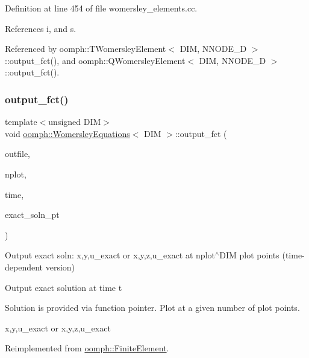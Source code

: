 Definition at line 454 of file womersley\+\_\+elements.\+cc.



References i, and s.



Referenced by oomph\+::\+T\+Womersley\+Element$<$ D\+I\+M, N\+N\+O\+D\+E\+\_\+D $>$\+::output\+\_\+fct(), and oomph\+::\+Q\+Womersley\+Element$<$ D\+I\+M, N\+N\+O\+D\+E\+\_\+D $>$\+::output\+\_\+fct().

\mbox{\label{classoomph_1_1WomersleyEquations_ab1468b769eeb97f0a603526531e01564}} 
\subsubsection{\texorpdfstring{output\+\_\+fct()}{output\_fct()}\hspace{0.1cm}{\footnotesize\ttfamily [2/2]}}
{\footnotesize\ttfamily template$<$unsigned D\+IM$>$ \\
void \hyperlink{classoomph_1_1WomersleyEquations}{oomph\+::\+Womersley\+Equations}$<$ D\+IM $>$\+::output\+\_\+fct (\begin{DoxyParamCaption}\item[{std\+::ostream \&}]{outfile,  }\item[{const unsigned \&}]{nplot,  }\item[{const double \&}]{time,  }\item[{\hyperlink{classoomph_1_1FiniteElement_ad4ecf2b61b158a4b4d351a60d23c633e}{Finite\+Element\+::\+Unsteady\+Exact\+Solution\+Fct\+Pt}}]{exact\+\_\+soln\+\_\+pt }\end{DoxyParamCaption})\hspace{0.3cm}{\ttfamily [virtual]}}



Output exact soln\+: x,y,u\+\_\+exact or x,y,z,u\+\_\+exact at nplot$^\wedge$\+D\+IM plot points (time-\/dependent version) 

Output exact solution at time t

Solution is provided via function pointer. Plot at a given number of plot points.

x,y,u\+\_\+exact or x,y,z,u\+\_\+exact 

Reimplemented from \hyperlink{classoomph_1_1FiniteElement_a2a8426dccd57b927be0ae0eec00d0479}{oomph\+::\+Finite\+Element}.



